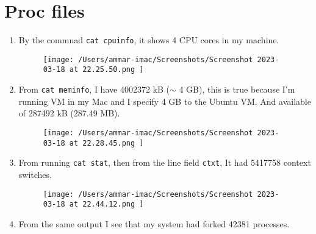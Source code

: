 \documentclass{article}
\def\c#1{\texttt{#1}}
\begin{document}
\section{Proc files}%
\begin{enumerate}
	\item By the commnad \c{cat cpuinfo}, it shows 4 CPU cores in my machine.
	      \begin{figure}[ht]
		      \centering
		      \texttt{[image: /Users/ammar-imac/Screenshots/Screenshot 2023-03-18 at 22.25.50.png ]}
	      \end{figure}
	      \newpage
	\item From \c{cat meminfo}, I have 4002372 kB ($\sim$ 4 GB), this is true because I'm running VM in my Mac and I
	      specify 4 GB to the Ubuntu VM. And available of 287492 kB (287.49 MB).
	      \begin{figure}[ht]
		      \centering
		      \texttt{[image: /Users/ammar-imac/Screenshots/Screenshot 2023-03-18 at 22.28.45.png ]}
	      \end{figure}
	\item From running \c{cat stat}, then from the line field \c{ctxt}, It had 5417758 context switches.
	      \begin{figure}[ht]
		      \centering
		      \texttt{[image: /Users/ammar-imac/Screenshots/Screenshot 2023-03-18 at 22.44.12.png ]}
	      \end{figure}
	\item From the same output I see that my system had forked 42381 processes.
\end{enumerate}


\newpage
\end{document}
